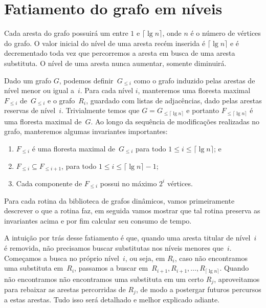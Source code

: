 \section{Fatiamento do grafo em níveis}
\label{sec:fatia-em-niveis}
Cada aresta do grafo possuirá um  entre $1$ e $\lceil \lg n \rceil$, onde $n$ é o número de vértices do grafo. O valor inicial do nível de uma aresta recém inserida é $\lceil \lg n \rceil$ e é decrementado toda vez que percorremos a aresta em busca de uma aresta substituta. O nível de uma aresta nunca aumentar, somente diminuirá. 

Dado um grafo $G$, podemos definir~$G_{\leqslant i}$ como o grafo induzido pelas arestas de nível menor ou igual a~$i$. Para cada nível $i$, manteremos uma floresta maximal~$F_{\leqslant i}$ de~$G_{\leqslant i}$ e o grafo~$R_i$, guardado com listas de adjacências, dado pelas arestas reservas de nível~$i$. Trivialmente temos que $G = G_{\leqslant \lceil \lg n \rceil}$ e portanto $F_{\leqslant \lceil \lg n \rceil}$ é uma floresta maximal de~$G$. Ao longo da sequência de modificações realizadas no grafo, manteremos algumas invariantes importantes:
\begin{enumerate}[label=(\roman*)]
    \item $F_{\leqslant i}$ é uma floresta maximal de~$G_{\leqslant i}$ para todo $1\leqslant i \leqslant \lceil \lg n \rceil$; e\label{invar:SF}
    \item $F_{\leqslant i}\subseteq F_{\leqslant i+1}$, para todo $1\leqslant i \leqslant \lceil \lg n \rceil-1$; \label{invar:contida}
    \item Cada componente de $F_{\leqslant i}$ possui no máximo $2^i$ vértices.\label{invar:tamanho}
\end{enumerate}

Para cada rotina da biblioteca de grafos dinâmicos, vamos primeiramente descrever o que a rotina faz, em seguida vamos mostrar que tal rotina preserva as invariantes acima e por fim calcular seu consumo de tempo.


A intuição por trás desse fatiamento é que, quando uma aresta titular de nível~$i$ é removida, não precisamos buscar substitutas nos níveis menores que~$i$. Começamos a busca no próprio nível~$i$, ou seja, em $R_i$, caso não encontramos uma substituta em~$R_i$, passamos a buscar em~$R_{i+1}, R_{i+1}, \ldots, R_{\lceil \lg n \rceil}$. Quando não encontramos não encontramos uma substituta em um certo $R_j$, aproveitamos para rebaixar as arestas percorridas de $R_j$, de modo a postergar futuros percursos a estas arestas. Tudo isso será detalhado e melhor explicado adiante.

